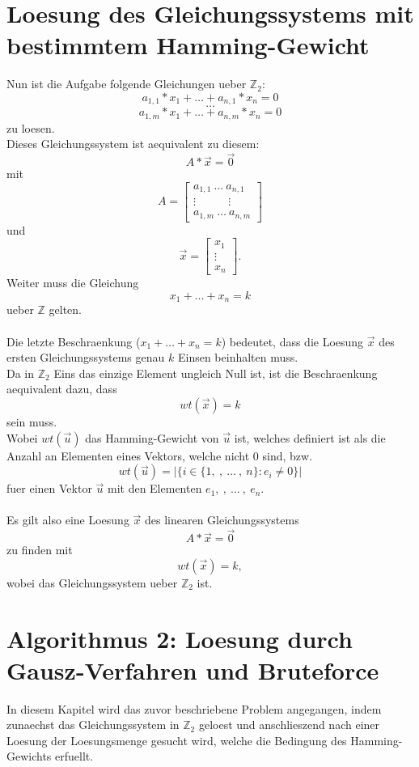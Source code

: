 \documentclass[a4paper,10pt,ngerman]{scrartcl}
\begin{document}
\section{Loesung des Gleichungssystems mit bestimmtem Hamming-Gewicht}
Nun ist die Aufgabe folgende Gleichungen ueber \(\mathbb{Z}_{2}\):
\[a_{1, 1} * x_1 + \dots + a_{n, 1} * x_n = 0\]
\[\dots\]
\[a_{1, m} * x_1 + \dots + a_{n, m}  * x_n = 0\]
zu loesen.\\
Dieses Gleichungssystem ist aequivalent zu diesem:
\[A * \vec{x} = \vec{0}\]
mit
\[A = \begin{bmatrix}
           a_{1, 1} \ \dots \ a_{n, 1} \\
           \vdots \ \ \ \ \ \ \ \ \ \ \ \ \ \vdots \\
           a_{1, m} \ \dots \ a_{n, m}
         \end{bmatrix} 
\] 
und
\[\vec{x} = \begin{bmatrix}
           x_{1} \\
           \vdots \\
           x_{n}
         \end{bmatrix} .
\]
Weiter muss die Gleichung
\[x_1 + \dots + x_n = k\]
ueber \(\mathbb{Z}\) gelten.\\
\\
Die letzte Beschraenkung ($x_1 + \dots + x_n = k $) bedeutet, dass die Loesung $\vec{x}$ des ersten Gleichungssystems genau $k$ Einsen beinhalten muss.\\
Da in $\mathbb{Z}_{2}$ Eins das einzige Element ungleich Null ist, ist die Beschraenkung aequivalent dazu, dass \\
$$
wt(\vec{x}) = k
$$
sein muss.\\
Wobei $wt(\vec{u})$ das Hamming-Gewicht von $\vec{u}$ ist, welches definiert ist als die Anzahl an Elementen eines Vektors, welche nicht $0$ sind, bzw.
$$
wt(\vec{u}) = | \{ i \in \{ 1, \ , \ \dots \ , \ n \} : e_i \not= 0 \} |
$$
fuer einen Vektor $\vec{u}$ mit den Elementen $e_1, \ , \ \dots \ , \ e_n$.
\\\\
Es gilt also eine Loesung $\vec{x}$ des linearen Gleichungssystems
\[A * \vec{x} = \vec{0}\]
zu finden mit
$$
wt(\vec{x}) = k, 
$$
wobei das Gleichungssystem ueber \(\mathbb{Z}_{2}\) ist.

\section{Algorithmus 2: Loesung durch Gausz-Verfahren und Bruteforce}
In diesem Kapitel wird das zuvor beschriebene Problem angegangen, indem zunaechst das Gleichungssystem in \(\mathbb{Z}_{2}\) geloest und anschlieszend nach einer Loesung der Loesungsmenge gesucht wird, welche die Bedingung des Hamming-Gewichts erfuellt.
\end{document}

